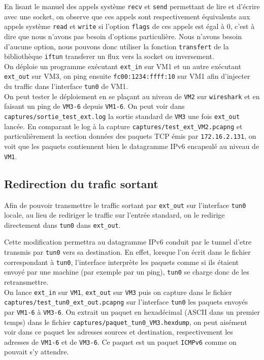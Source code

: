 \documentclass[a4paper, 10pt]{article}
\begin{document}
      En lisant le manuel des appels système \verb+recv+ et \verb+send+
      permettant de lire et d'écrire avec une socket, on observe que ces appels
      sont respectivement équivalents aux appels système \verb+read+ et
      \verb+write+ si l'option \verb+flags+ de ces appels est égal à 0, c'est à
      dire que nous n'avons pas besoin d'options particulière. Nous n'avons
      besoin d'aucune option, nous pouvons donc utiliser la fonction
      \verb+transfert+ de la bibliothèque \verb+iftun+ transferer un flux vers
      la socket ou inversement. \\

      On déploie un programme exécutant \verb+ext_in+ sur VM1 et un autre
      exécutant \verb+ext_out+ sur VM3, on ping ensuite \verb+fc00:1234:ffff:10+
      sur VM1 afin d'injecter du traffic dans l'interface \verb+tun0+ de VM1. \\

      On peut tester le déploiement en se plaçant au niveau de \verb+VM2+ sur
      \verb+wireshark+ et en faisant un ping de \verb+VM3-6+ depuis
      \verb+VM1-6+. On peut voir dans \verb+captures/sortie_test_ext.log+ la
      sortie standard de \verb+VM3+ une fois \verb+ext_out+ lancée. En comparant
      le log à la capture \verb+captures/test_ext_VM2.pcapng+ et
      particulièrement la section données des paquets TCP émis par
      \verb+172.16.2.131+, on voit que les paquets contiennent bien le
      datagramme IPv6 encapsulé au niveau de \verb+VM1+.

    \subsection{Redirection du trafic sortant}
      Afin de pouvoir transmettre le traffic sortant par \verb+ext_out+ sur
      l'interface \verb+tun0+ locale, au lieu de rediriger le traffic sur
      l'entrée standard, on le redirige directement dans \verb+tun0+ dans
      \verb+ext_out+.

      Cette modification permettra au datagramme IPv6 conduit par le tunnel
      d'etre transmis par \verb+tun0+ vers sa destination. En effet, lorsque
      l'on écrit dans le fichier correspondant à \verb+tun0+, l'interface
      interprète les paquets comme si ils étaient envoyé par une machine (par
      exemple par un ping), \verb+tun0+ se charge donc de les retransmettre. \\

      On lance \verb+ext_in+ sur \verb+VM1+, \verb+ext_out+ sur \verb+VM3+ puis
      on capture dans le fichier \verb+captures/test_tun0_ext_out.pcapng+ sur
      l'interface \verb+tun0+ les paquets envoyés par \verb+VM1-6+ à
      \verb+VM3-6+. On extrait un paquet en hexadécimal (ASCII dans un premier
      temps) dans le fichier \verb+captures/paquet_tun0_VM3.hexdump+, on peut
      aisément voir dans ce paquet les adresses sources et destination,
      respectivement les adresses de \verb+VM1-6+ et de \verb+VM3-6+. Ce paquet
      est un paquet \verb+ICMPv6+ comme on pouvait s'y attendre. \\
\end{document}
